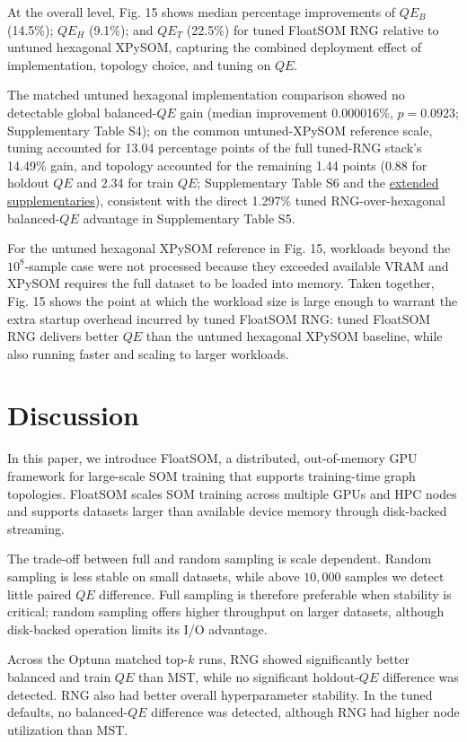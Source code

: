 \documentclass[10pt]{article} %
\begin{document}
At the overall level, Fig. 15 shows median percentage improvements of $QE_B$ (14.5\%); $QE_H$ (9.1\%); and $QE_T$ (22.5\%) for tuned FloatSOM RNG relative to untuned hexagonal XPySOM, capturing the combined deployment effect of implementation, topology choice, and tuning on $QE$.

The matched untuned hexagonal implementation comparison showed no detectable global balanced-$QE$ gain (median improvement 0.000016\%, $p=0.0923$; Supplementary Table S4); on the common untuned-XPySOM reference scale, tuning accounted for 13.04 percentage points of the full tuned-RNG stack's 14.49\% gain, and topology accounted for the remaining 1.44 points (0.88 for holdout $QE$ and 2.34 for train $QE$; Supplementary Table S6 and the \href{https://github.com/1ordinateur/floatsom-publication/blob/main/extended_supplementaries.zip}{extended supplementaries}), consistent with the direct 1.297\% tuned RNG-over-hexagonal balanced-$QE$ advantage in Supplementary Table S5.

For the untuned hexagonal XPySOM reference in Fig. 15, workloads beyond the $10^8$-sample case were not processed because they exceeded available VRAM and XPySOM requires the full dataset to be loaded into memory. Taken together, Fig. 15 shows the point at which the workload size is large enough to warrant the extra startup overhead incurred by tuned FloatSOM RNG: tuned FloatSOM RNG delivers better $QE$ than the untuned hexagonal XPySOM baseline, while also running faster and scaling to larger workloads.

\section{Discussion}

In this paper, we introduce FloatSOM, a distributed, out-of-memory GPU framework for large-scale SOM training that supports training-time graph topologies. FloatSOM scales SOM training across multiple GPUs and HPC nodes and supports datasets larger than available device memory through disk-backed streaming.

The trade-off between full and random sampling is scale dependent. Random sampling is less stable on small datasets, while above $10{,}000$ samples we detect little paired $QE$ difference. Full sampling is therefore preferable when stability is critical; random sampling offers higher throughput on larger datasets, although disk-backed operation limits its I/O advantage.

Across the Optuna matched top-$k$ runs, RNG showed significantly better balanced and train $QE$ than MST, while no significant holdout-$QE$ difference was detected. RNG also had better overall hyperparameter stability. In the tuned defaults, no balanced-$QE$ difference was detected, although RNG had higher node utilization than MST.
\end{document}
